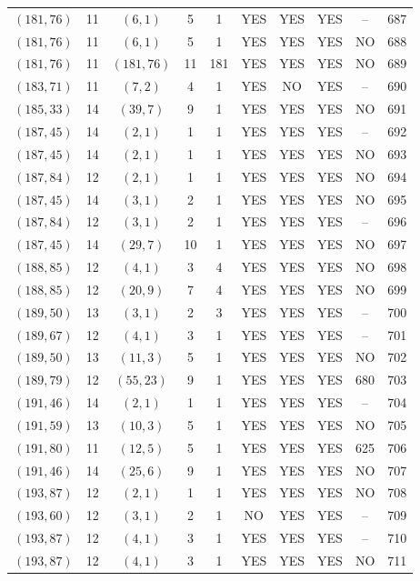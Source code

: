 \begin{longtable}{|c|c|c|c|c|c|c|c|c|c|}
$(181, 76)$ & 11 & $(6, 1)$ & 5 & 1 & YES & YES & YES & -- & 687\\
$(181, 76)$ & 11 & $(6, 1)$ & 5 & 1 & YES & YES & YES & NO & 688\\
$(181, 76)$ & 11 & $(181, 76)$ & 11 & 181 & YES & YES & YES & NO & 689\\
$(183, 71)$ & 11 & $(7, 2)$ & 4 & 1 & YES & NO & YES & -- & 690\\
$(185, 33)$ & 14 & $(39, 7)$ & 9 & 1 & YES & YES & YES & NO & 691\\
$(187, 45)$ & 14 & $(2, 1)$ & 1 & 1 & YES & YES & YES & -- & 692\\
$(187, 45)$ & 14 & $(2, 1)$ & 1 & 1 & YES & YES & YES & NO & 693\\
$(187, 84)$ & 12 & $(2, 1)$ & 1 & 1 & YES & YES & YES & NO & 694\\
$(187, 45)$ & 14 & $(3, 1)$ & 2 & 1 & YES & YES & YES & NO & 695\\
$(187, 84)$ & 12 & $(3, 1)$ & 2 & 1 & YES & YES & YES & -- & 696\\
$(187, 45)$ & 14 & $(29, 7)$ & 10 & 1 & YES & YES & YES & NO & 697\\
$(188, 85)$ & 12 & $(4, 1)$ & 3 & 4 & YES & YES & YES & NO & 698\\
$(188, 85)$ & 12 & $(20, 9)$ & 7 & 4 & YES & YES & YES & NO & 699\\
$(189, 50)$ & 13 & $(3, 1)$ & 2 & 3 & YES & YES & YES & -- & 700\\
$(189, 67)$ & 12 & $(4, 1)$ & 3 & 1 & YES & YES & YES & -- & 701\\
$(189, 50)$ & 13 & $(11, 3)$ & 5 & 1 & YES & YES & YES & NO & 702\\
$(189, 79)$ & 12 & $(55, 23)$ & 9 & 1 & YES & YES & YES & 680 & 703\\
$(191, 46)$ & 14 & $(2, 1)$ & 1 & 1 & YES & YES & YES & -- & 704\\
$(191, 59)$ & 13 & $(10, 3)$ & 5 & 1 & YES & YES & YES & NO & 705\\
$(191, 80)$ & 11 & $(12, 5)$ & 5 & 1 & YES & YES & YES & 625 & 706\\
$(191, 46)$ & 14 & $(25, 6)$ & 9 & 1 & YES & YES & YES & NO & 707\\
$(193, 87)$ & 12 & $(2, 1)$ & 1 & 1 & YES & YES & YES & NO & 708\\
$(193, 60)$ & 12 & $(3, 1)$ & 2 & 1 & NO & YES & YES & -- & 709\\
$(193, 87)$ & 12 & $(4, 1)$ & 3 & 1 & YES & YES & YES & -- & 710\\
$(193, 87)$ & 12 & $(4, 1)$ & 3 & 1 & YES & YES & YES & NO & 711\\

\end{longtable}
